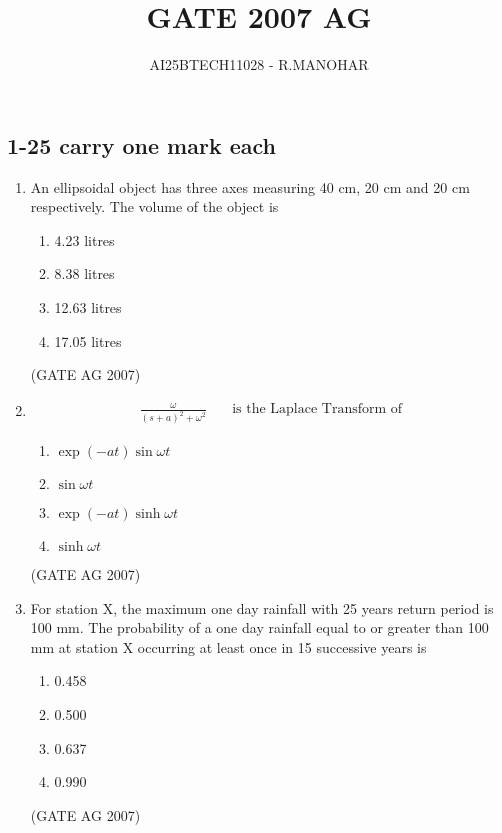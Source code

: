 \documentclass[journal,12pt,onecolumn]{IEEEtran}
\theoremstyle{remark}
\begin{document}
\title{GATE 2007 AG}
\author{AI25BTECH11028 - R.MANOHAR}
\maketitle
\renewcommand{\thefigure}{\theenumi}
\renewcommand{\thetable}{\theenumi}

\subsection*{1-25 carry one mark each}

\begin{enumerate}

\item  An ellipsoidal object has three axes measuring 40 cm, 20 cm and 20 cm respectively.
The volume of the object is
\begin{multicols}{4}
  \begin{enumerate}
  \item 4.23 litres
 \item 8.38 litres
 \item 12.63 litres
  \item 17.05 litres
\end{enumerate}  
\end{multicols}
\hfill(GATE AG 2007)
 
\item 
\begin{align*}
\frac{\omega}{(s + a)^2 + \omega^2} &\quad \text{is the Laplace Transform of}
\end{align*}
\begin{multicols}{2}
\begin{enumerate}
  
  \item $\exp(-at) \sin \omega t$
  
  \item $\sin \omega t$
  
   \item $\exp(-at) \sinh \omega t$
  
  \item $\sinh \omega t$
\end{enumerate}
\end{multicols}
\hfill(GATE AG 2007)


\item  For station X, the maximum one day rainfall with 25 years return period is 100 mm.
The probability of a one day rainfall equal to or greater than 100 mm at station X occurring at least once in 15 successive years is
\begin{multicols}{4}
\begin{enumerate}
  \item 0.458
  \item 0.500
  \item 0.637
  \item 0.990
\end{enumerate}
\end{multicols}
\hfill(GATE AG 2007)


\end{enumerate}
\end{document}

